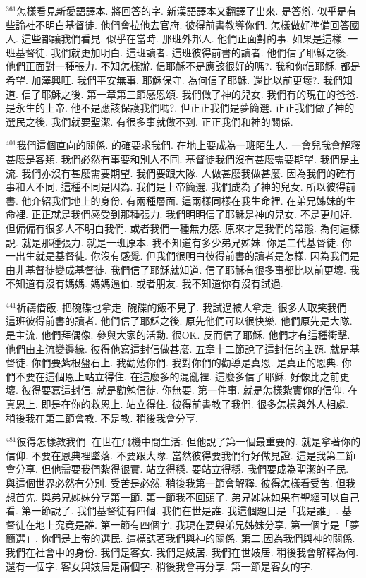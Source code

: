 \documentclass{book}
\begin{document}
$^{361}$怎樣看見新愛語譯本.
將回答的字.
新漢語譯本又翻譯了出來.
是答辯.
似乎是有些論社不明白基督徒.
他們會拉他去官府.
彼得前書教導你們.
怎樣做好準備回答國人.
這些都讓我們看見.
似乎在當時.
那班外邦人.
他們正面對的事.
如果是這樣.
一班基督徒.
我們就更加明白.
這班讀者.
這班彼得前書的讀者.
他們信了耶穌之後.
他們正面對一種張力.
不知怎樣辦.
信耶穌不是應該很好的嗎?.
我和你信耶穌.
都是希望.
加澤興旺.
我們平安無事.
耶穌保守.
為何信了耶穌.
還比以前更壞?.
我們知道.
信了耶穌之後.
第一章第三節感恩頌.
我們做了神的兒女.
我們有的現在的爸爸.
是永生的上帝.
他不是應該保護我們嗎?.
但正正我們是夢簡選.
正正我們做了神的選民之後.
我們就要聖潔.
有很多事就做不到.
正正我們和神的關係.

$^{401}$我們這個直向的關係.
的確要求我們.
在地上要成為一班陌生人.
一會兒我會解釋甚麼是客類.
我們必然有事要和別人不同.
基督徒我們沒有甚麼需要期望.
我們是主流.
我們亦沒有甚麼需要期望.
我們要跟大隊.
人做甚麼我做甚麼.
因為我們的確有事和人不同.
這種不同是因為.
我們是上帝簡選.
我們成為了神的兒女.
所以彼得前書.
他介紹我們地上的身份.
有兩種層面.
這兩樣同樣在我生命裡.
在弟兄姊妹的生命裡.
正正就是我們感受到那種張力.
我們明明信了耶穌是神的兒女.
不是更加好.
但偏偏有很多人不明白我們.
或者我們一種無力感.
原來才是我們的常態.
為何這樣說.
就是那種張力.
就是一班原本.
我不知道有多少弟兄姊妹.
你是二代基督徒.
你一出生就是基督徒.
你沒有感覺.
但我們很明白彼得前書的讀者是怎樣.
因為我們是由非基督徒變成基督徒.
我們信了耶穌就知道.
信了耶穌有很多事都比以前更壞.
我不知道有沒有媽媽.
媽媽逼伯.
或者朋友.
我不知道你有沒有試過.

$^{441}$祈禱借飯.
把碗碟也拿走.
碗碟的飯不見了.
我試過被人拿走.
很多人取笑我們.
這班彼得前書的讀者.
他們信了耶穌之後.
原先他們可以很快樂.
他們原先是大隊.
是主流.
他們拜偶像.
參與大家的活動.
很OK.
反而信了耶穌.
他們才有這種衝擊.
他們由主流變邊緣.
彼得他寫這封信做甚麼.
五章十二節說了這封信的主題.
就是基督徒.
你們要紮根盤石上.
我勸勉你們.
我對你們的勸導是真恩.
是真正的恩典.
你們不要在這個恩上站立得住.
在這麼多的混亂裡.
這麼多信了耶穌.
好像比之前更壞.
彼得要寫這封信.
就是勸勉信徒.
你無要.
第一件事.
就是怎樣紮實你的信仰.
在真恩上.
即是在你的救恩上.
站立得住.
彼得前書教了我們.
很多怎樣與外人相處.
稍後我在第二節會教.
不是教.
稍後我會分享.

$^{481}$彼得怎樣教我們.
在世在飛機中間生活.
但他說了第一個最重要的.
就是拿著你的信仰.
不要在恩典裡墜落.
不要跟大隊.
當然彼得要我們行好做見證.
這是我第二節會分享.
但他需要我們紮得很實.
站立得穩.
要站立得穩.
我們要成為聖潔的子民.
與這個世界必然有分別.
受苦是必然.
稍後我第一節會解釋.
彼得怎樣看受苦.
但我想首先.
與弟兄姊妹分享第一節.
第一節我不回頭了.
弟兄姊妹如果有聖經可以自己看.
第一節說了.
我們基督徒有四個.
我們在世是誰.
我這個題目是「我是誰」.
基督徒在地上究竟是誰.
第一節有四個字.
我現在要與弟兄姊妹分享.
第一個字是「夢簡選」.
你們是上帝的選民.
這標誌著我們與神的關係.
第二,因為我們與神的關係.
我們在社會中的身份.
我們是客女.
我們是妓居.
我們在世妓居.
稍後我會解釋為何.
還有一個字.
客女與妓居是兩個字.
稍後我會再分享.
第一節是客女的字.
\end{document}
